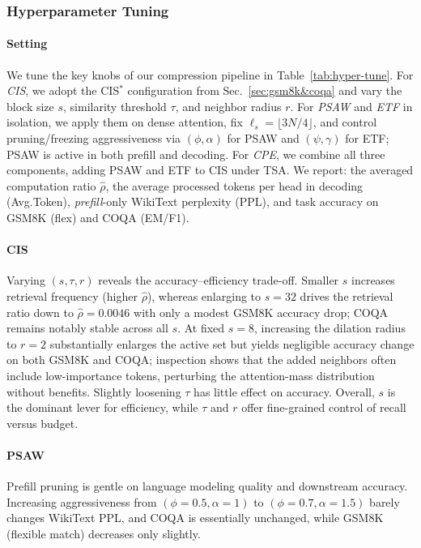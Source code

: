 \subsubsection{Hyperparameter Tuning}
\label{sec:hyper-tune}
\paragraph{Setting} We tune the key knobs of our compression pipeline in Table~\ref{tab:hyper-tune}. For \emph{CIS}, we adopt the CIS$^\ast$ configuration from Sec.~\ref{sec:gsm8k&coqa} and vary the block size $s$, similarity threshold $\tau$, and neighbor radius $r$. For \emph{PSAW} and \emph{ETF} in isolation, we apply them on dense attention, fix $\ell_s=\lfloor 3N/4\rfloor$, and control pruning/freezing aggressiveness via $(\phi,\alpha)$ for PSAW and $(\psi,\gamma)$ for ETF; PSAW is active in both prefill and decoding. For \emph{CPE}, we combine all three components, adding PSAW and ETF to CIS under TSA. We report: the averaged computation ratio $\hat{\rho}$, the average processed tokens per head in decoding (Avg.Token), \emph{prefill}-only WikiText perplexity (PPL), and task accuracy on GSM8K (flex) and COQA (EM/F1).

\paragraph{CIS} Varying $(s,\tau,r)$ reveals the accuracy–efficiency trade-off. Smaller $s$ increases retrieval frequency (higher $\hat{\rho}$), whereas enlarging to $s{=}32$ drives the retrieval ratio down to $\hat{\rho}{=}0.0046$ with only a modest GSM8K accuracy drop; COQA remains notably stable across all $s$. At fixed $s{=}8$, increasing the dilation radius to $r{=}2$ substantially enlarges the active set but yields negligible accuracy change on both GSM8K and COQA; inspection shows that the added neighbors often include low-importance tokens, perturbing the attention-mass distribution without benefits. Slightly loosening $\tau$ has little effect on accuracy. Overall, $s$ is the dominant lever for efficiency, while $\tau$ and $r$ offer fine-grained control of recall versus budget.

\paragraph{PSAW} Prefill pruning is gentle on language modeling quality and downstream accuracy. Increasing aggressiveness from $(\phi{=}0.5,\alpha{=}1)$ to $(\phi{=}0.7,\alpha{=}1.5)$ barely changes WikiText PPL, and COQA is essentially unchanged, while GSM8K (flexible match) decreases only slightly.

